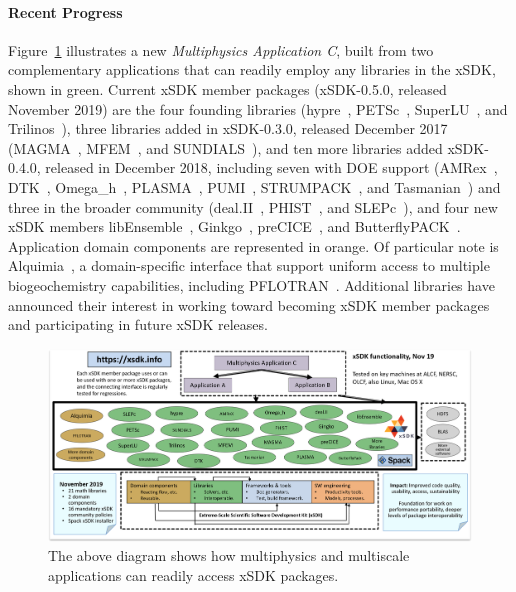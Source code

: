 \paragraph{Recent Progress}

Figure~\ref{fig:xsdk-schematic} illustrates a new {\em Multiphysics
	Application C}, built from two complementary applications that can
readily employ any libraries in the xSDK, shown in green.  Current xSDK member packages (xSDK-0.5.0, released November 2019) are the four founding libraries
(hypre~\cite{hypre:homepage}, PETSc~\cite{petsc:homepage}, SuperLU~\cite{superlu:homepage}, and Trilinos~\cite{trilinos:homepage}), three libraries added in xSDK-0.3.0, released December 2017 (MAGMA~\cite{magma:homepage}, MFEM~\cite{mfem:homepage}, and SUNDIALS~\cite{sundials:homepage}), and ten more libraries added xSDK-0.4.0, released in December 2018, including seven with DOE support (AMRex~\cite{amrex:homepage}, DTK~\cite{dtk:homepage}, Omega\_h~\cite{omega_h:homepage}, PLASMA~\cite{plasma:homepage}, PUMI~\cite{pumi:homepage}, STRUMPACK~\cite{strumpack:homepage}, and Tasmanian~\cite{tasmanian:homepage}) and three in the broader community (deal.II~\cite{deal.ii:homepage}, PHIST~\cite{phist:homepage}, and SLEPc~\cite{slepc:homepage}), and four new xSDK members libEnsemble~\cite{libensemble:homepage}, Ginkgo~\cite{ginkgo:homepage}, preCICE~\cite{precice:homepage}, and ButterflyPACK~\cite{butterflypack:homepage}.
Application domain components are represented
in orange.  Of particular note is Alquimia~\cite{alquimia:homepage}, a domain-specific interface
that support uniform access to multiple biogeochemistry capabilities, including
PFLOTRAN~\cite{pflotran:homepage}.  Additional libraries have announced their interest in working toward becoming xSDK member packages and participating in future xSDK releases.
\begin{figure}[htb]
	\centering
	\includegraphics[width=5in]{projects/2.3.3-MathLibs/2.3.3.01-xSDK/xSDK-diagram.png}
	\caption{\label{fig:xsdk-schematic} The above diagram shows how multiphysics and multiscale applications can readily access xSDK packages.}
\end{figure}


